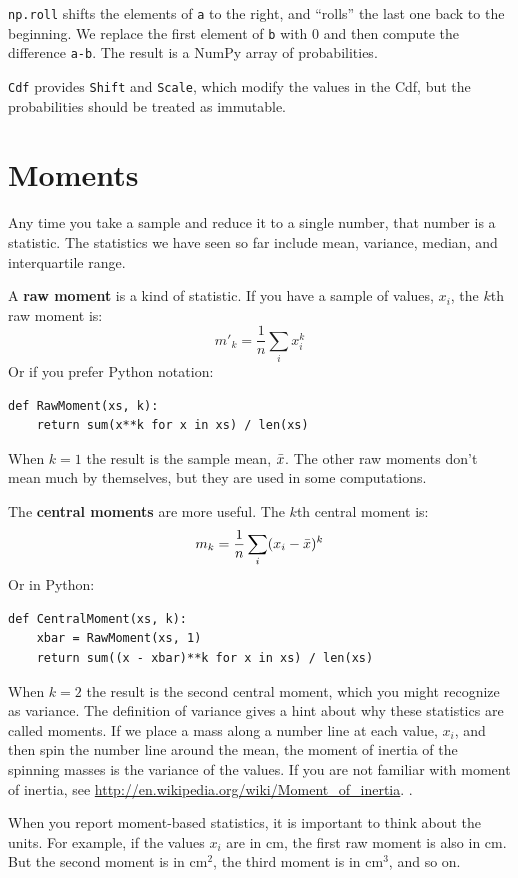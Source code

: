 \documentclass[12pt]{book}
\begin{document}
{\tt np.roll} shifts the elements of {\tt a} to the right, and ``rolls''
the last one back to the beginning.  We replace the first element of
{\tt b} with 0 and then compute the difference {\tt a-b}.  The result
is a NumPy array of probabilities.

{\tt Cdf} provides {\tt Shift} and {\tt Scale}, which modify the
values in the Cdf, but the probabilities should be treated as
immutable.


\section{Moments}

Any time you take a sample and reduce it to a single number, that
number is a statistic.  The statistics we have seen so far include
mean, variance, median, and interquartile range.

A {\bf raw moment} is a kind of statistic.  If you have a sample of
values, $x_i$, the $k$th raw moment is:
%
\[ m'_k = \frac{1}{n} \sum_i x_i^k \]
%
Or if you prefer Python notation:

\begin{verbatim}
def RawMoment(xs, k):
    return sum(x**k for x in xs) / len(xs)
\end{verbatim}

When $k=1$ the result is the sample mean, $\bar{x}$.  The other
raw moments don't mean much by themselves, but they are used
in some computations.

The {\bf central moments} are more useful.  The
$k$th central moment is:
%
\[ m_k = \frac{1}{n} \sum_i (x_i - \bar{x})^k \]
%
Or in Python:

\begin{verbatim}
def CentralMoment(xs, k):
    xbar = RawMoment(xs, 1)
    return sum((x - xbar)**k for x in xs) / len(xs)
\end{verbatim}

When $k=2$ the result is the second central moment, which you might
recognize as variance.  The definition of variance gives a hint about
why these statistics are called moments.  If we place a mass along a
number line at each value, $x_i$, and then spin the number line around
the mean, the moment of inertia of the spinning masses is the variance
of the values.  If you are not familiar with moment of inertia, see
\url{http://en.wikipedia.org/wiki/Moment_of_inertia}.  .

When you report moment-based statistics, it is important to think
about the units.  For example, if the values $x_i$ are in cm, the
first raw moment is also in cm.  But the second moment is in
cm$^2$, the third moment is in cm$^3$, and so on.
\end{document}
